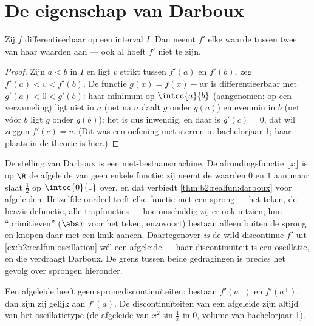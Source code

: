 \section{De eigenschap van Darboux}

\begin{theorem}[Darboux]\label{thm:b2:realfun:darboux}
Zij $f$ differentieerbaar op een interval $I$. Dan neemt $f'$ elke
waarde tussen twee van haar waarden aan --- ook al hoeft $f'$ niet
 te zijn.
\end{theorem}

\begin{proof}
Zijn $a < b$ in $I$ en ligt $v$ strikt tussen $f'(a)$ en $f'(b)$,
zeg $f'(a) < v < f'(b)$. De functie $g(x) = f(x) - vx$ is
differentieerbaar met $g'(a) < 0 < g'(b)$: haar minimum op
$\intcc{a}{b}$ (aangenomen:  op een 
verzameling) ligt niet in $a$ (net na $a$ daalt $g$ onder $g(a)$)
en evenmin in $b$ (net vóór $b$ ligt $g$ onder $g(b)$): het is dus
inwendig, en daar is $g'(c) = 0$, dat wil zeggen $f'(c) = v$. (Dit
was een oefening met sterren in bachelorjaar 1; haar plaats in de
theorie is hier.)
\end{proof}

\begin{example}\label{ex:b2:realfun:whichderivatives}
De stelling van Darboux is een niet-bestaansmachine. De
afrondingsfunctie $\lfloor x\rfloor$ is op $\R$ de afgeleide van
geen enkele functie: zij neemt de waarden $0$ en $1$ aan maar slaat
$\frac12$ op $\intcc{0}{1}$ over, en dat verbiedt
\cref{thm:b2:realfun:darboux} voor afgeleiden. Hetzelfde oordeel
treft elke functie met een sprong --- het teken, de
heavisidefunctie, alle trapfuncties --- hoe onschuldig zij er ook
uitzien; hun ``primitieven'' ($\abs x$ voor het teken, enzovoort)
bestaan alleen buiten de sprong en knopen daar met een knik aaneen.
Daartegenover \emph{is} de wild discontinue $f'$ uit
\cref{ex:b2:realfun:oscillation} wél een afgeleide --- haar
discontinuïteit is een oscillatie, en die verdraagt Darboux. De
grens tussen beide gedragingen is precies het gevolg over
sprongen hieronder.
\end{example}

\begin{corollary}\label{cor:b2:realfun:nojumps}
Een afgeleide heeft geen sprongdiscontinuïteiten: bestaan $f'(a^-)$
en $f'(a^+)$, dan zijn zij gelijk aan $f'(a)$. De
discontinuïteiten van een afgeleide zijn altijd van het
oscillatietype (de afgeleide van $x^2\sin\frac1x$ in $0$, volume
van bachelorjaar 1).
\end{corollary}

